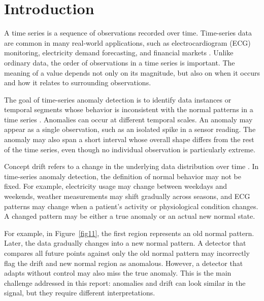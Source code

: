 \chapter{Introduction}







A time series is a sequence of observations recorded over time. Time-series data are common in many real-world applications, such as electrocardiogram (ECG) monitoring, electricity demand forecasting, and financial markets \citep{schmidl2022anomaly}. Unlike ordinary data, the order of observations in a time series is important. The meaning of a value depends not only on its magnitude, but also on when it occurs and how it relates to surrounding observations.

The goal of time-series anomaly detection is to identify data instances or temporal segments whose behavior is inconsistent with the normal patterns in a time series \citep{chandola2009anomaly}. Anomalies can occur at different temporal scales. An anomaly may appear as a single observation, such as an isolated spike in a sensor reading. The anomaly may also span a short interval whose overall shape differs from the rest of the time series, even though no individual observation is particularly extreme. 

Concept drift refers to a change in the underlying data distribution over time \citep{gama2014survey,lu2019learning}. In time-series anomaly detection, the definition of normal behavior may not be fixed. For example, electricity usage may change between weekdays and weekends, weather measurements may shift gradually across seasons, and ECG patterns may change when a patient's activity or physiological condition changes. A changed pattern may be either a true anomaly or an actual new normal state.

For example, in Figure~\ref{fig11}, the first region represents an old normal pattern. Later, the data gradually changes into a new normal pattern. A detector that compares all future points against only the old normal pattern may incorrectly flag the drift and new normal region as anomalous. However, a detector that adapts without control may also miss the true anomaly. This is the main challenge addressed in this report: anomalies and drift can look similar in the signal, but they require different interpretations. 

